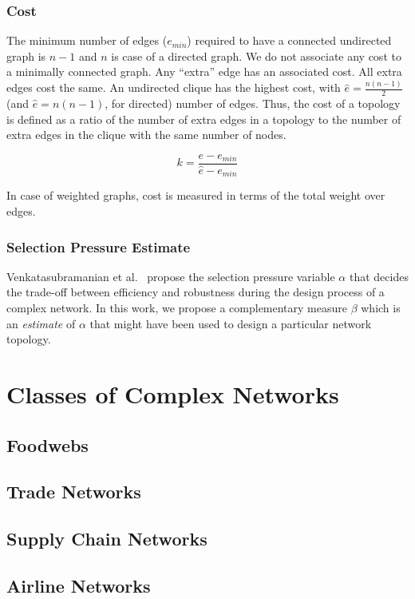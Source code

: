 \documentclass[a4paper,10pt]{article}
\begin{document}
\subsubsection{Cost}
The minimum number of edges ($e_{min}$) required to have a connected undirected graph is $n - 1$ and $n$ is case of a directed graph. We do not associate any cost to a minimally connected graph. Any ``extra'' edge has an associated cost. All extra edges cost the same. An undirected clique has the highest cost, with $\hat{e} = \frac{n(n - 1)}{2}$ (and $\hat{e} = n(n - 1)$, for directed) number of edges. Thus, the cost of a topology is defined as a ratio of the number of extra edges in a topology to the number of extra edges in the clique with the same number of nodes.

\[ k = \frac{e - e_{min}} {\hat{e} - e_{min}} \]

In case of weighted graphs, cost is measured in terms of the total weight over edges.

\subsubsection{Selection Pressure Estimate}
Venkatasubramanian et al.~\cite{venkat04} propose the selection pressure variable $\alpha$ that decides the trade-off between efficiency and robustness during the design process of a complex network. In this work, we propose a complementary measure $\beta$ which is an \textit{estimate} of $\alpha$ that might have been used to design a particular network topology.

\section{Classes of Complex Networks}
\subsection{Foodwebs}
\subsection{Trade Networks}
\subsection{Supply Chain Networks}
\subsection{Airline Networks}
\end{document}
